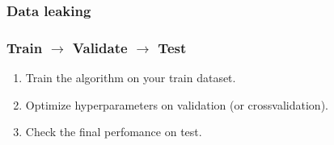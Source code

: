 \subsubsection*{Data leaking}

{\it <Examples with EEG and MRT>}

\subsubsection*{Train $\rightarrow$ Validate $\rightarrow$ Test}

\begin{enumerate}[label=$\bullet$]
  \item Train the algorithm on your train dataset.
  \item Optimize hyperparameters on validation (or crossvalidation).
  \item Check the final perfomance on test.
\end{enumerate}